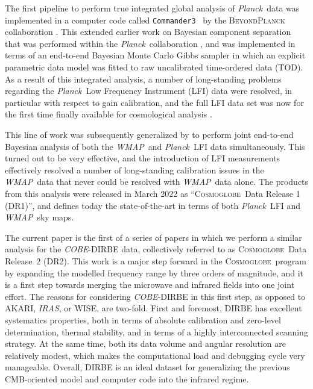 \documentclass{aa}
\def\Cosmoglobe{\textsc{Cosmoglobe}}
\def\commanderthree{\texttt{Commander3}}
\def\Planck{\textit{Planck}}
\def\WMAP{\textit{WMAP}}
\def\COBE{\textit{COBE}}
\def\AKARI{\textrm{{AKARI}}}
\def\IRAS{\textit{{IRAS}}}
\newcommand{\cosmoglobe}{\textsc{Cosmoglobe}}
\begin{document}
The first pipeline to perform true integrated global analysis of \Planck\ data was implemented in a computer code called \commanderthree\ \citep{bp03} by the \textsc{BeyondPlanck} collaboration \citep{bp01}. This extended earlier work on Bayesian component separation that was performed within the \Planck\ collaboration \citep{planck2014-a12}, and was implemented in terms of an end-to-end Bayesian Monte Carlo Gibbs sampler in which an explicit parametric data model was fitted to raw uncalibrated time-ordered data (TOD). As a result of this integrated analysis, a number of long-standing problems regarding the \Planck\ Low Frequency Instrument (LFI) data \citep{planck2016-l02} were resolved, in particular with respect to gain calibration, and the full LFI data set was now for the first time finally available for cosmological analysis \citep{bp10,bp11,bp12}.

This line of work was subsequently generalized by \citet{watts2023_dr1} to perform joint end-to-end Bayesian analysis of both the \WMAP\ and \Planck\ LFI data simultaneously. This turned out to be very effective, and the introduction of LFI measurements effectively resolved a number of long-standing calibration issues in the \WMAP\ data that never could be resolved with \WMAP\ data alone. The products from this analysis were released in March 2022 as ``\Cosmoglobe\ Data Release 1 (DR1)'', and defines today the state-of-the-art in terms of both \Planck\ LFI and \WMAP\ sky maps.

The current paper is the first of a series of papers in which we perform a similar analysis for the \COBE-DIRBE data, collectively referred to as \cosmoglobe\ Data Release~2 (DR2). This work is a major step forward in the \Cosmoglobe\ program by expanding the modelled frequency range by three orders of magnitude, and it is a first step towards merging the microwave and infrared fields into one joint effort. The reasons for considering \COBE-DIRBE in this first step, as opposed to \AKARI, \IRAS, or WISE, are two-fold. First and foremost, DIRBE has excellent systematics properties, both in terms of absolute calibration and zero-level determination, thermal stability, and in terms of a highly interconnected scanning strategy. At the same time, both its data volume and angular resolution are relatively modest, which  makes the computational load and debugging cycle very manageable. Overall, DIRBE is an ideal dataset for generalizing the previous CMB-oriented model and computer code into the infrared regime.
\end{document}
